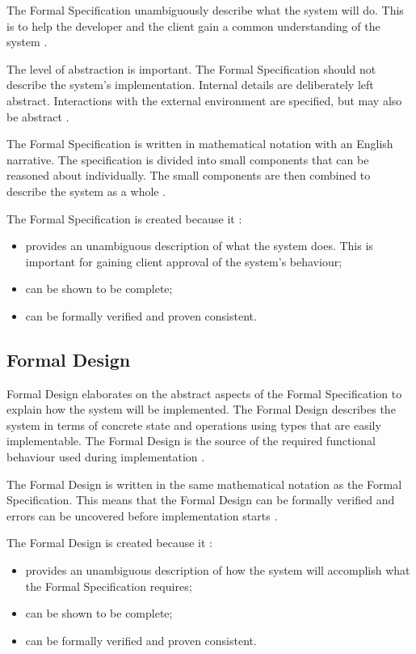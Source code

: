 The Formal Specification unambiguously describe what the system
will do. This is to help the developer and the client gain a common understanding
of the system \parencite{Tokeneer}.

The level of abstraction is important. The Formal Specification should not describe 
the system's implementation. Internal details are deliberately left abstract. 
Interactions with the external environment are specified, but may also be abstract \parencite{Tokeneer}.

The Formal Specification is written in mathematical notation with an English 
narrative. The specification is divided into small components that can be reasoned
about individually. The small components are then combined to describe the system
as a whole \parencite{Tokeneer}.

The Formal Specification is created because it \parencite{Tokeneer}:
\begin{itemize}
	\item provides an unambiguous description of what the system does. This is
		important for gaining client approval of the system's behaviour;
	\item can be shown to be complete;
	\item can be formally verified and proven consistent.
\end{itemize}

\subsection{Formal Design}

Formal Design elaborates on the abstract aspects of the Formal 
Specification to explain how the system will be implemented. The Formal Design 
describes the system in terms of concrete state and operations using types that
are easily implementable. The Formal Design is the source of the required functional
behaviour used during implementation  \parencite{Tokeneer}.

The Formal Design is written in the same mathematical notation as the Formal Specification.
This means that the Formal Design can be formally verified and errors can be uncovered
before implementation starts \parencite{Tokeneer}.

The Formal Design is created because it \parencite{Tokeneer}:
\begin{itemize}
	\item provides an unambiguous description of how the system will accomplish what the Formal Specification requires;
	\item can be shown to be complete;
	\item can be formally verified and proven consistent.
\end{itemize}


